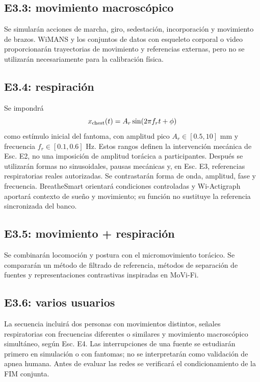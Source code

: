 \subsection{E3.3: movimiento macroscópico}

Se simularán acciones de marcha, giro, sedestación, incorporación y movimiento de brazos. WiMANS y los conjuntos de datos con esqueleto corporal o video proporcionarán trayectorias de movimiento y referencias externas, pero no se utilizarán necesariamente para la calibración física.

\subsection{E3.4: respiración}

Se impondrá
\begin{equation}
x_{\rm chest}(t)=A_r\sin(2\pi f_rt+\phi)
\end{equation}
como estímulo inicial del fantoma, con amplitud pico $A_r\in[0.5,10]$ mm y
frecuencia $f_r\in[0.1,0.6]$ Hz. Estos rangos definen la intervención mecánica de
Esc. E2, no una imposición de amplitud torácica a participantes. Después se utilizarán
formas no sinusoidales, pausas mecánicas y, en Esc. E3, referencias respiratorias
reales autorizadas. Se contrastarán forma de onda, amplitud, fase y frecuencia.
BreatheSmart orientará condiciones controladas y Wi-Actigraph aportará contexto de
sueño y movimiento; su función no sustituye la referencia sincronizada del banco.

\subsection{E3.5: movimiento + respiración}

Se combinarán locomoción y postura con el micromovimiento torácico. Se compararán un método de filtrado de referencia, métodos de separación de fuentes y representaciones contrastivas inspiradas en MoVi-Fi.

\subsection{E3.6: varios usuarios}

La secuencia incluirá dos personas con movimientos distintos, señales respiratorias
con frecuencias diferentes o similares y movimiento macroscópico simultáneo, según
Esc. E4. Las interrupciones de una fuente se estudiarán primero en simulación o con
fantomas; no se interpretarán como validación de apnea humana. Antes de evaluar las
redes se verificará el condicionamiento de la FIM conjunta.

